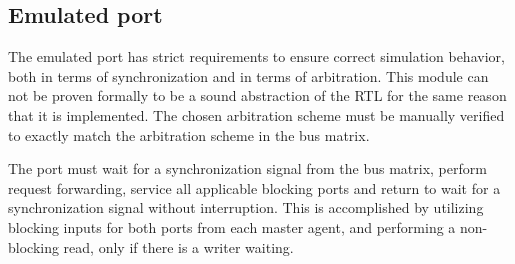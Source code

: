 \subsection{Emulated port}
\label{sub:portem}
The emulated port has strict requirements to ensure correct simulation behavior, both in terms of synchronization and in terms of arbitration. This module can not be proven formally to be a sound abstraction of the RTL for the same reason that it is implemented. The chosen arbitration scheme must be manually verified to exactly match the arbitration scheme in the bus matrix. \par
The port must wait for a synchronization signal from the bus matrix, perform request forwarding, service all applicable blocking ports and return to wait for a synchronization signal without interruption. This is accomplished by utilizing blocking inputs for both ports from each master agent, and performing a non-blocking read, only if there is a writer waiting. 


